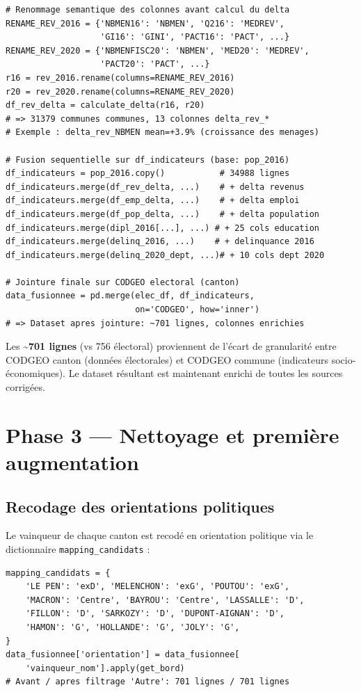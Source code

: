 \documentclass[12pt,a4paper,oneside]{report}
\newcommand{\code}[1]{\texttt{\small #1}}
\begin{document}
\begin{lstlisting}[caption={Calcul des deltas réels 2016→2020 — Phase 2 corrigée}]
# Renommage semantique des colonnes avant calcul du delta
RENAME_REV_2016 = {'NBMEN16': 'NBMEN', 'Q216': 'MEDREV',
                   'GI16': 'GINI', 'PACT16': 'PACT', ...}
RENAME_REV_2020 = {'NBMENFISC20': 'NBMEN', 'MED20': 'MEDREV',
                   'PACT20': 'PACT', ...}
r16 = rev_2016.rename(columns=RENAME_REV_2016)
r20 = rev_2020.rename(columns=RENAME_REV_2020)
df_rev_delta = calculate_delta(r16, r20)
# => 31379 communes communes, 13 colonnes delta_rev_*
# Exemple : delta_rev_NBMEN mean=+3.9% (croissance des menages)

# Fusion sequentielle sur df_indicateurs (base: pop_2016)
df_indicateurs = pop_2016.copy()           # 34988 lignes
df_indicateurs.merge(df_rev_delta, ...)    # + delta revenus
df_indicateurs.merge(df_emp_delta, ...)    # + delta emploi
df_indicateurs.merge(df_pop_delta, ...)    # + delta population
df_indicateurs.merge(dipl_2016[...], ...) # + 25 cols education
df_indicateurs.merge(delinq_2016, ...)    # + delinquance 2016
df_indicateurs.merge(delinq_2020_dept, ...)# + 10 cols dept 2020

# Jointure finale sur CODGEO electoral (canton)
data_fusionnee = pd.merge(elec_df, df_indicateurs,
                          on='CODGEO', how='inner')
# => Dataset apres jointure: ~701 lignes, colonnes enrichies
\end{lstlisting}

Les \textbf{\textasciitilde 701 lignes} (vs 756 électoral) proviennent de l'écart de granularité entre CODGEO canton (données électorales) et CODGEO commune (indicateurs socio-économiques). Le dataset résultant est maintenant enrichi de toutes les sources corrigées.

\section{Phase 3 — Nettoyage et première augmentation}

\subsection{Recodage des orientations politiques}

Le vainqueur de chaque canton est recodé en orientation politique via le dictionnaire \code{mapping\_candidats} :

\begin{lstlisting}[caption={Mapping candidats vers blocs politiques — Phase 3}]
mapping_candidats = {
    'LE PEN': 'exD', 'MELENCHON': 'exG', 'POUTOU': 'exG',
    'MACRON': 'Centre', 'BAYROU': 'Centre', 'LASSALLE': 'D',
    'FILLON': 'D', 'SARKOZY': 'D', 'DUPONT-AIGNAN': 'D',
    'HAMON': 'G', 'HOLLANDE': 'G', 'JOLY': 'G',
}
data_fusionnee['orientation'] = data_fusionnee[
    'vainqueur_nom'].apply(get_bord)
# Avant / apres filtrage 'Autre': 701 lignes / 701 lignes
\end{lstlisting}
\end{document}
